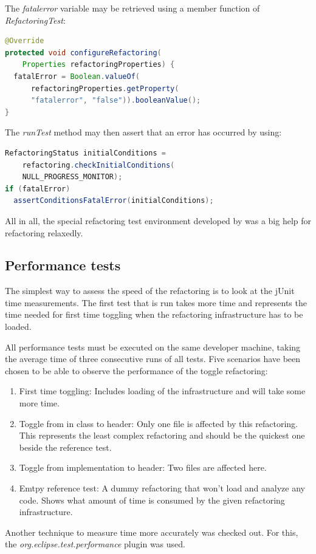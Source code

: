 The \textit{fatalerror} variable may be retrieved using a member function of \textit{RefactoringTest}:
\begin{lstlisting}[caption={Accessing a property set in the .rts file},
language=java]
@Override
protected void configureRefactoring(
    Properties refactoringProperties) {
  fatalError = Boolean.valueOf(
      refactoringProperties.getProperty(
      "fatalerror", "false")).booleanValue();
}
\end{lstlisting}

The \textit{runTest} method may then assert that an error has occurred by using:
\begin{lstlisting}[caption={Checking for errors inside the refactoring test class},language=java]
RefactoringStatus initialConditions = 
    refactoring.checkInitialConditions(
    NULL_PROGRESS_MONITOR);
if (fatalError)
  assertConditionsFatalError(initialConditions);
\end{lstlisting}

All in all, the special refactoring test environment developed by \cite{GB06} 
was a big help for refactoring relaxedly.

\subsection{Performance tests}

The simplest way to assess the speed of the refactoring is to look at the jUnit 
time measurements. The first test that is run takes more time and represents the 
time needed for first time toggling when the refactoring infrastructure has to 
be loaded. 

All performance tests must be executed on the same developer machine, taking the 
average time of three consecutive runs of all tests. Five scenarios have been 
chosen to be able to observe the performance of the toggle refactoring:

\begin{enumerate}
\item First time toggling: Includes loading of the infrastructure and will take 
some more time.
\item Toggle from in class to header: Only one file is affected by this 
refactoring. This represents the least complex refactoring and should be the 
quickest one beside the reference test.
\item Toggle from implementation to header: Two files are affected here.
\item Emtpy reference test: A dummy refactoring that won't load and analyze any 
code. Shows what amount of time is consumed by the given refactoring 
infrastructure.
\end{enumerate}

Another technique to measure time more accurately was checked out. For this, the 
\textit{org.eclipse.test.performance} plugin was used. 


